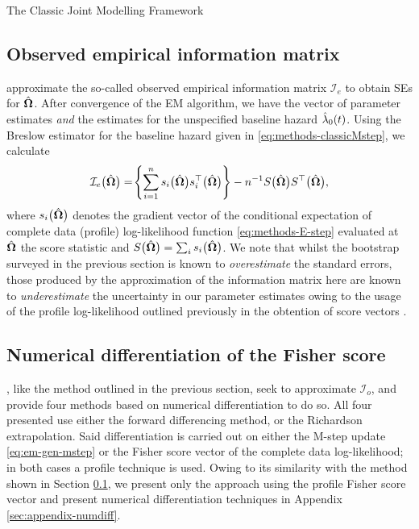 \begin{chapter}{\label{cha:methods-classic}The Classic Joint Modelling Framework}
  \subsection{Observed empirical information matrix}\label{sec:methods-SE-obsemp}
  \citet{Hickey2018} approximate the so-called observed empirical information matrix $\mathcal{I}_e$ to obtain SEs for $\hat{\bm{\Omega}}$. After convergence of the EM algorithm, we have the vector of parameter estimates \textit{and} the estimates for the unspecified baseline hazard $\hat{\lambda}_0\!\left( t\right)$. Using the Breslow estimator for the baseline hazard given in \eqref{eq:methods-classicMstep}, we calculate
  \begin{equation}
      \mathcal{I}_e\big(\hat{\bm{\Omega}}\big)=\!\left\{\sum_{i=1}^n s_i\big(\hat{\bm{\Omega}}\big)s_i^\top\big(\hat{\bm{\Omega}}\big)\right\}-n^{-1}S\big(\hat{\bm{\Omega}}\big) S^\top\big(\hat{\bm{\Omega}}\big),
  \label{eq:methods-obsemp}
  \end{equation}
  where $s_i\big(\hat{\bm{\Omega}}\big)$ denotes the gradient vector of the conditional expectation of complete data (profile) log-likelihood function \eqref{eq:methods-E-step} evaluated at $\hat{\bm{\Omega}}$ \ie the score statistic and $S\big(\hat{\bm{\Omega}}\big)=\sum_is_i\big(\hat{\bm{\Omega}}\big)$. We note that whilst the bootstrap surveyed in the previous section is known to \textit{overestimate} the standard errors, those produced by the approximation of the information matrix here are known to \textit{underestimate} the uncertainty in our parameter estimates owing to the usage of the profile log-likelihood outlined previously in the obtention of score vectors  \citep{Hsieh2006}.
  \subsection{Numerical differentiation of the Fisher score}\label{sec:methods-SE-xu2014}
  \citet{Xu2014}, like the method outlined in the previous section, seek to approximate $\mathcal{I}_o$, and provide four methods based on numerical differentiation to do so. All four presented use either the forward differencing method, or the Richardson extrapolation. Said differentiation is carried out on either the M-step update \eqref{eq:em-gen-mstep} or the Fisher score vector of the complete data log-likelihood; in both cases a profile technique is used. Owing to its similarity with the method shown in Section \ref{sec:methods-SE-obsemp}, we present only the approach using the profile Fisher score vector and present numerical differentiation techniques in Appendix \ref{sec:appendix-numdiff}.


\end{chapter}
